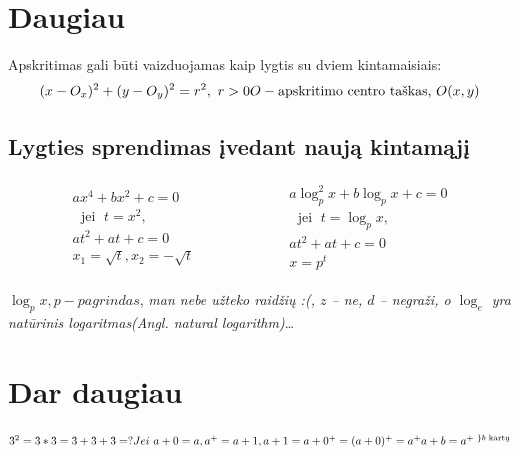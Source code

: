 \documentclass[fleqn]{article} %
\DeclareMathOperator{\jei}{\ jei\ }
\begin{document}
\section{Daugiau}

Apskritimas gali būti vaizduojamas kaip lygtis su dviem kintamaisiais:
\[
    (x - O_x)^2 + (y - O_y)^2 = r^2,\ r > 0 \\ 
    O - \text{apskritimo centro taškas, } O(x, y)
\]

\subsection{Lygties sprendimas įvedant naują kintamąjį}

\begin{align*}
    \begin{aligned}
    ax^4 + bx^2 + c = 0                 \\
    \jei t = x^2,                       \\
    at^2 + at + c = 0                   \\
    x_1 = \sqrt{t}, x_2 = -\sqrt{t}     
    \end{aligned}
    \qquad\qquad\qquad
    \begin{aligned}
    a\log^2_p x + b\log_p x + c = 0     \\
    \jei t = \log_p x,                  \\
    at^2 + at + c = 0                   \\
    x = p^t
    \end{aligned}
\end{align*}

$\log_p x, p - pagrindas$, \textit{man nebe užteko raidžių :(, $z$ -- ne, $d$ -- negraži, o $\log_e$ yra natūrinis logaritmas(Angl. natural logarithm)}\dots

\section{Dar daugiau}

\begin{math}
    3^2 = 3 * 3 = 3 + 3 + 3 = ? \\
    \\
    Jei\ a + 0 = a, a^+ = a + 1, \\
    a + 1 = a + 0^+ = (a + 0)^+ = a^+ \\
    a + b = a^{+\ \}b \text{ kartų}}
\end{math} 
\end{document}
